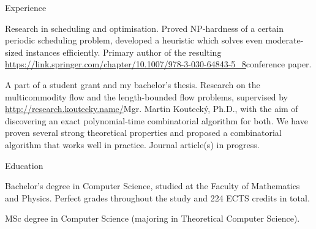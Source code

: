 \newif\ifdoublecolumn
\doublecolumnfalse




\newdimen\hei
\hei=1.5cm

\vskip 3mm
\doublecolumns

\sekce Experience

%
Research in scheduling and optimisation. Proved NP-hardness of a certain
periodic scheduling problem, developed a heuristic which solves even
moderate-sized instances efficiently. Primary author of the resulting \url{https://link.springer.com/chapter/10.1007/978-3-030-64843-5_8}{conference paper}.

%
A part of a student grant and my bachelor's thesis. Research on the
multicommodity flow and the length-bounded flow problems, supervised by
\url{http://research.koutecky.name/}{Mgr. Martin Koutecký, Ph.D.}, with the aim
of discovering an exact polynomial-time combinatorial algorithm for both. We have proven
several strong theoretical properties and proposed a combinatorial algorithm
that works well in practice. Journal article(s) in progress.

\sekce Education


Bachelor's degree in Computer Science, studied at the Faculty of Mathematics
and Physics. Perfect grades throughout the study and 224 ECTS credits in total.


MSc degree in Computer Science (majoring in Theoretical Computer Science).

